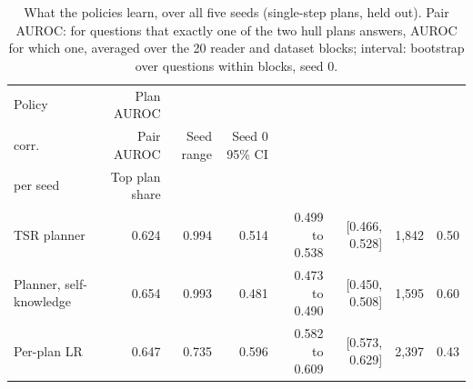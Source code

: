 \begin{table}[t]
\centering\small
\setlength{\tabcolsep}{4pt}
\caption{What the policies learn, over all five seeds (single-step plans, held out). Pair AUROC: for questions that exactly one of the two hull plans answers, AUROC for which one, averaged over the 20 reader and dataset blocks; interval: bootstrap over questions within blocks, seed 0.}
\label{tab:robust_mechanism}
\begin{tabular*}{\linewidth}{@{\extracolsep{\fill}}lrrrrrrr}
\toprule
Policy & Plan AUROC & \begin{tabular}[b]{@{}r@{}}Cross plan \\ corr.\end{tabular} & Pair AUROC & Seed range & Seed 0 95\% CI & \begin{tabular}[b]{@{}r@{}}Pair questions \\ per seed\end{tabular} & Top plan share \\
\midrule
TSR planner & 0.624 & 0.994 & 0.514 & 0.499 to 0.538 & [0.466, 0.528] & 1,842 & 0.50 \\
Planner, self-knowledge & 0.654 & 0.993 & 0.481 & 0.473 to 0.490 & [0.450, 0.508] & 1,595 & 0.60 \\
Per-plan LR & 0.647 & 0.735 & 0.596 & 0.582 to 0.609 & [0.573, 0.629] & 2,397 & 0.43 \\
\bottomrule
\end{tabular*}
\end{table}
